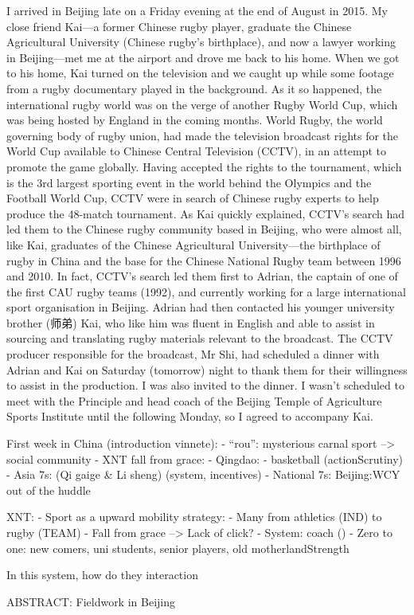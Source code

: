 I arrived in Beijing late on a Friday evening at the end of August in 2015.  My close friend Kai---a former Chinese rugby player, graduate the Chinese Agricultural University (Chinese rugby's birthplace), and now a lawyer working in Beijing---met me at the airport and drove me back to his home.  When we got to his home, Kai turned on the television and we caught up while some footage from a rugby documentary played in the background.  As it so happened, the international rugby world was on the verge of another Rugby World Cup, which was being hosted by England in the coming months. World Rugby, the world governing body of rugby union, had made the television broadcast rights for the World Cup available to Chinese Central Television (CCTV), in an attempt to promote the game globally.  Having accepted the rights to the tournament, which is the 3rd largest sporting event in the world behind the Olympics and the Football World Cup, CCTV were in search of Chinese rugby experts to help produce the 48-match tournament.  As Kai quickly explained, CCTV's search had led them to the Chinese rugby community based in Beijing, who were almost all, like Kai, graduates of the Chinese Agricultural University---the birthplace of rugby in China and the base for the Chinese National Rugby team between 1996 and 2010.  In fact, CCTV's search led them first to Adrian, the captain of one of the first CAU rugby teams (1992), and currently working for a large international sport organisation in Beijing.  Adrian had then contacted his younger university brother (师弟) Kai, who like him was fluent in English and able to assist in sourcing and translating rugby materials relevant to the broadcast. The CCTV producer responsible for the broadcast, Mr Shi, had scheduled a dinner with Adrian and Kai on Saturday (tomorrow) night to thank them for their willingness to assist in the production.  I was also invited to the dinner. I wasn't scheduled to meet with the Principle and head coach of the Beijing Temple of Agriculture Sports Institute until the following Monday, so I agreed to accompany Kai.







First week in China (introduction vinnete):
- ``rou'': mysterious carnal sport --> social community
- XNT fall from grace:
- Qingdao:
    - basketball (actionScrutiny)
    - Asia 7s: (Qi gaige & Li sheng) (system, incentives)
    - National 7s: Beijing:WCY out of the huddle


XNT:
- Sport as a upward mobility strategy:
    - Many from athletics (IND) to rugby (TEAM)
- Fall from grace --> Lack of click?
- System: coach ()
- Zero to one: new comers, uni students, senior players, old motherlandStrength

In this system, how do they interaction

ABSTRACT:
Fieldwork in Beijing
